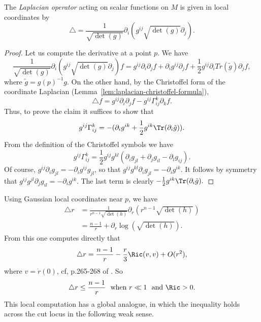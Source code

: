 \begin{lemma}
\label{lem:laplacian-local-formula}
\leanok
The \textit{Laplacian operator} acting on scalar
functions on $M$ is given in local coordinates by
\[ \triangle  = \frac{1}{\sqrt{\det(g)}}\partial_i
\left(g^{ij}\sqrt{\det(g)}\partial_j\right). \]
\end{lemma}

\begin{proof}
\leanok
Let us compute the derivative at a point $p$. We have
$$\frac{1}{\sqrt{\det(g)}}\partial_i
\left(g^{ij}\sqrt{\det(g)}\partial_j\right)f=g^{ij}\partial_i\partial_jf+\partial_ig^{ij}\partial_jf+
\frac{1}{2}g^{ij}\partial_iTr(\tilde g)\partial_jf,$$ where $\tilde
g=g(p)^{-1}g$. On the other hand, by the Christoffel form of the
coordinate Laplacian (Lemma~\ref{lem:laplacian-christoffel-formula}),
$$\triangle
f=g^{ij}\partial_i\partial_jf-g^{ij}\Gamma_{ij}^k\partial_kf.$$ Thus,
to prove the claim it suffices to show that
$$g^{ij}\Gamma_{ij}^k=-(\partial_ig^{ik}+\frac{1}{2}g^{ik}\Tr(\partial_i\tilde g)).$$
From the definition of the Christoffel symbols we have
$$g^{ij}\Gamma_{ij}^k=\frac{1}{2}g^{ij}g^{kl}(\partial_ig_{jl}+\partial_jg_{il}-\partial_lg_{ij}).$$
Of course, $g^{ij}\partial_ig_{jl}=-\partial_ig^{ij}g_{jl}$, so that
 $g^{ij}g^{kl}\partial_ig_{jl}=-\partial_ig^{ik}$. It follows by symmetry that $g^{ij}g^{jl}\partial_jg_{il}
 =-\partial_ig^{ik}$. The last term is clearly $-\frac{1}{2}g^{ik}\Tr(\partial_i\tilde g).$
\end{proof}

Using Gaussian local coordinates near $p$, we have
\begin{align*}
\triangle r &=
\frac{1}{r^{n-1}\sqrt{\det(h)}}\partial_r\left(r^{n-1}\sqrt{\det(h)}\right)\\
&= \frac{n-1}{r}
 + \partial_r\log\left(\sqrt{\det(h)}\right).
\end{align*}
From this one computes directly that
 \[ \triangle r
 = \frac{n-1}{r} - \frac{r}{3}\Ric(v,v)+ O(r^{2}), \]
 where $v = \dot r(0)$, cf,  p.265-268 of \cite{Petersen}. So
 $$\triangle r \leq
 \frac{n-1}{r}\ \ \text{when } r \ll 1\ \ \text{and } \Ric > 0.$$
This local computation has a global analogue, in which the
inequality holds across the cut locus in the following weak sense.

